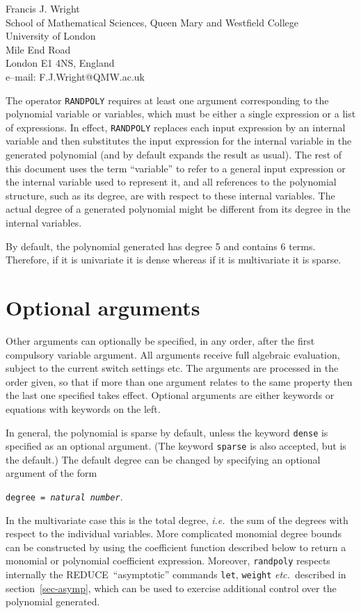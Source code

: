 \documentclass[11pt,letterpaper]{book}
\makeatletter
\newcommand{\REDUCE}{REDUCE}
\newcommand{\underscore}{\_}
\newcommand{\ttindex}[1]{{\renewcommand{\_}{\protect\underscore}%
                          \index{#1@{\tt #1}}}}
\makeatother
\begin{document}
{\footnotesize
\begin{center}
Francis J. Wright \\
School of Mathematical Sciences, Queen Mary and Westfield College \\
University of London \\
Mile End Road \\
London E1 4NS, England \\[0.05in]
e--mail: F.J.Wright@QMW.ac.uk
\end{center}
}
\ttindex{RANDPOLY}

The operator {\tt RANDPOLY}\ttindex{RANDPOLY} requires at least one
argument corresponding to the polynomial variable or variables, which
must be either a single expression or a list of expressions.
In effect, {\tt RANDPOLY} replaces each input expression by an
internal variable and then substitutes the input expression for the
internal variable in the generated polynomial (and by default expands
the result as usual).  The rest of this document
uses the term ``variable'' to refer to a general input expression or
the internal variable used to represent it, and all references to the
polynomial structure, such as its degree, are with respect to these
internal variables.  The actual degree of a generated polynomial might
be different from its degree in the internal variables.

By default, the polynomial generated has degree 5 and contains 6
terms.  Therefore, if it is univariate it is dense whereas if it is
multivariate it is sparse.

\section{Optional arguments}

Other arguments can optionally be specified, in any order, after the
first compulsory variable argument.  All arguments receive full
algebraic evaluation, subject to the current switch settings etc.  The
arguments are processed in the order given, so that if more than one
argument relates to the same property then the last one specified
takes effect.  Optional arguments are either keywords or equations
with keywords on the left.

In general, the polynomial is sparse by default, unless the keyword
{\tt dense} is specified as an optional
argument.  (The keyword {\tt sparse} is
also accepted, but is the default.)  The default degree can be changed
by specifying an optional argument of the form
\begin{center}
  {\tt degree = {\it natural number}}.
\end{center}
In the multivariate case this is the total degree, {\em i.e.\ }the sum of
the degrees with respect to the individual variables.
More complicated monomial degree bounds can be constructed by using
the coefficient function described below to return a monomial or
polynomial coefficient expression.  Moreover, {\tt randpoly} respects
internally the \REDUCE\ ``asymptotic'' commands {\tt let}, {\tt weight}
{\em etc.\ }described in section~\ref{sec-asymp}, which can be used
to exercise additional control over the polynomial generated.
\end{document}
